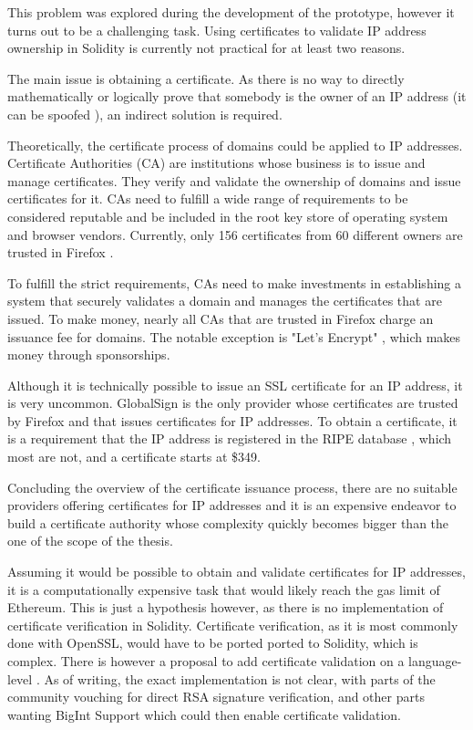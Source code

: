 This problem was explored during the development of the prototype, however it turns out to be a challenging task. Using certificates to validate IP address ownership in Solidity is currently not practical for at least two reasons.

The main issue is obtaining a certificate. As there is no way to directly mathematically or logically prove that somebody is the owner of an IP address (it can be spoofed \cite{IPSource38}), an indirect solution is required.

Theoretically, the certificate process of domains could be applied to IP addresses. Certificate Authorities (CA) are institutions whose business is to issue and manage certificates. They verify and validate the ownership of domains and issue certificates for it. CAs need to fulfill a wide range of requirements \cite{BaselineRequirements} to be considered reputable and be included in the root key store of operating system and browser vendors. Currently, only 156 certificates from 60 different owners are trusted in Firefox \cite{httpscca67}.

To fulfill the strict requirements, CAs need to make investments in establishing a system that securely validates a domain and manages the certificates that are issued. To make money, nearly all CAs that are trusted in Firefox charge an issuance fee for domains. The notable exception is "Let's Encrypt" \cite{LetsEncrypt}, which makes money through sponsorships.

Although it is technically possible to issue an SSL certificate for an IP address, it is very uncommon. GlobalSign \cite{GlobalSign} is the only provider whose certificates are trusted by Firefox and that issues certificates for IP addresses. To obtain a certificate, it is a requirement that the IP address is registered in the RIPE database \cite{Database95}, which most are not, and a certificate starts at \$349.

Concluding the overview of the certificate issuance process, there are no suitable providers offering certificates for IP addresses and it is an expensive endeavor to build a certificate authority whose complexity quickly becomes bigger than the one of the scope of the thesis.

Assuming it would be possible to obtain and validate certificates for IP addresses, it is a computationally expensive task that would likely reach the gas limit of Ethereum. This is just a hypothesis however, as there is no implementation of certificate verification in Solidity. Certificate verification, as it is most commonly done with OpenSSL, would have to be ported ported to Solidity, which is complex.
There is however a proposal to add certificate validation on a language-level \cite{EIP74}. As of writing, the exact implementation is not clear, with parts of the community vouching for direct RSA signature verification, and other parts wanting BigInt Support which could then enable certificate validation.

